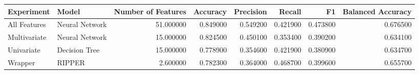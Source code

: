 \begin{tabular}{llrrrrrr}
\toprule
Experiment & Model & Number of Features & Accuracy & Precision & Recall & F1 & Balanced Accuracy \\
\midrule
All Features & Neural Network & 51.000000 & 0.849000 & 0.549200 & 0.421900 & 0.473800 & 0.676500 \\
Multivariate & Neural Network & 15.000000 & 0.824500 & 0.450100 & 0.353400 & 0.390200 & 0.634100 \\
Univariate & Decision Tree & 15.000000 & 0.778900 & 0.354600 & 0.421900 & 0.380900 & 0.634700 \\
Wrapper & RIPPER & 2.600000 & 0.782300 & 0.364000 & 0.468700 & 0.399600 & 0.655700 \\
\bottomrule
\end{tabular}
